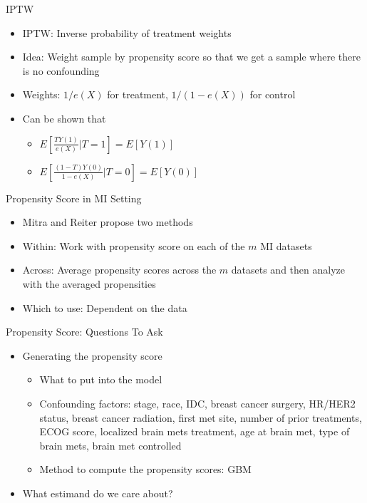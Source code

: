 \begin{frame}{IPTW}
\begin{itemize}
\item IPTW: Inverse probability of treatment weights
\item Idea: Weight sample by propensity score so that we get a sample where there is no confounding
\item Weights: $1/e(X)$ for treatment, $1/(1-e(X))$ for control
\item Can be shown that 
\begin{itemize}
 \item $E[\frac{TY(1)}{e(X)}|T=1]=E[Y(1)]$
 \item $E[\frac{(1-T)Y(0)}{1-e(X)}|T=0]=E[Y(0)]$
\end{itemize}
 
\end{itemize}

\end{frame}

\begin{frame}{Propensity Score in MI Setting}
\begin{itemize}
 \item Mitra and Reiter propose two methods \cite{Mitra2012}
 \item Within: Work with propensity score on each of the $m$ MI datasets
 \item Across: Average propensity scores across the $m$ datasets and then analyze with the averaged propensities
 \item Which to use: Dependent on the data
\end{itemize} 
\end{frame}

\begin{frame}{Propensity Score: Questions To Ask}
\begin{itemize}
\item Generating the propensity score
\begin{itemize}
\item What to put into the model
  \item Confounding factors: stage, race, IDC, breast cancer surgery, HR/HER2 status,
  breast cancer radiation, first met site, number of prior treatments, ECOG score,
  localized brain mets treatment, age at brain met, type of brain mets, brain met controlled
 \item Method to compute the propensity scores: GBM
\end{itemize}
\item What estimand do we care about?
\end{itemize} 
\end{frame}



